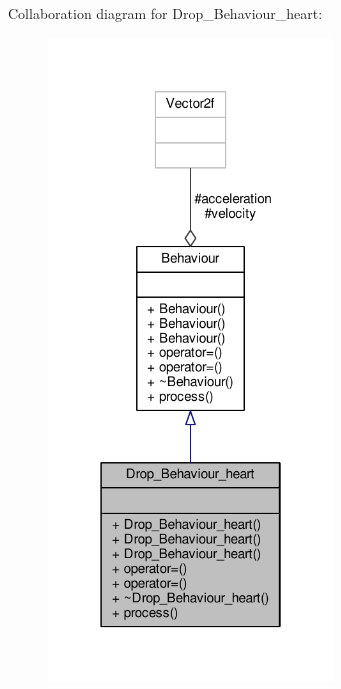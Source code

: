 Collaboration diagram for Drop\+\_\+\+Behaviour\+\_\+heart\+:\nopagebreak
\begin{figure}[H]
\begin{center}
\leavevmode
\includegraphics[width=214pt]{classDrop__Behaviour__heart__coll__graph}
\end{center}
\end{figure}
